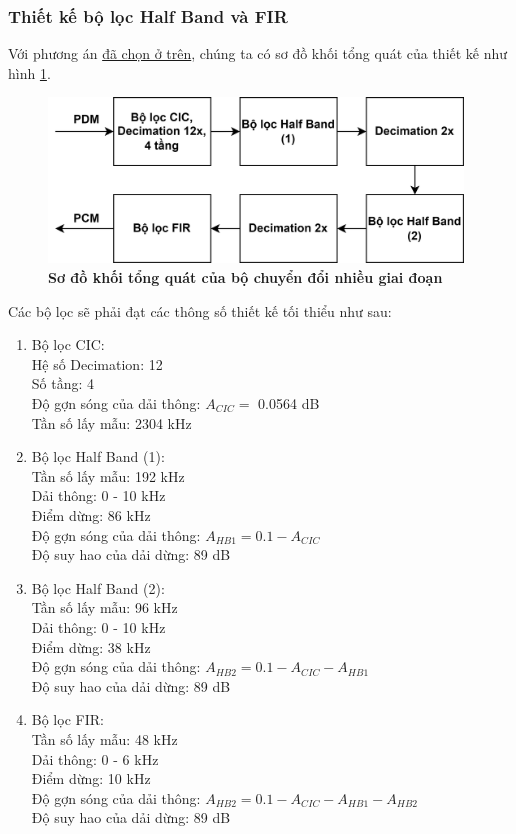 \subsubsection{Thiết kế bộ lọc Half Band và FIR}
Với phương án \hyperref[choose]{đã chọn ở trên}, chúng ta có sơ đồ khối tổng quát của thiết kế như hình \ref{pipeline_new}.
\begin{figure}[H]
    \centering
    \includegraphics[width=11cm]{Images/Chuong3/pipeline_new_top.png}
    \caption[Sơ đồ khối tổng quát của bộ chuyển đổi nhiều giai đoạn]{\bfseries \fontsize{12pt}{0pt}\selectfont Sơ đồ khối tổng quát của bộ chuyển đổi nhiều giai đoạn}
    \label{pipeline_new}
\end{figure}
 \noindent Các bộ lọc sẽ phải đạt các thông số thiết kế tối thiểu như sau:
\begin{enumerate}
    \item Bộ lọc CIC: \\
    Hệ số Decimation: 12\\
    Số tầng: 4\\
    Độ gợn sóng của dải thông: $A_{CIC} =$ 0.0564 dB\\
    Tần số lấy mẫu: 2304 kHz
    \item Bộ lọc Half Band (1):\\
    Tần số lấy mẫu: 192 kHz\\
    Dải thông: 0 - 10 kHz\\
    Điểm dừng: 86 kHz\\
    Độ gợn sóng của dải thông: $A_{HB1} = 0.1 - A_{CIC}$\\
    Độ suy hao của dải dừng: 89 dB
    \item Bộ lọc Half Band (2):\\
    Tần số lấy mẫu: 96 kHz\\
    Dải thông: 0 - 10 kHz\\
    Điểm dừng: 38 kHz\\
    Độ gợn sóng của dải thông: $A_{HB2} = 0.1 - A_{CIC} - A_{HB1}$\\
    Độ suy hao của dải dừng: 89 dB
    \item Bộ lọc FIR:\\
    Tần số lấy mẫu: 48 kHz\\
    Dải thông: 0 - 6 kHz\\
    Điểm dừng: 10 kHz\\
    Độ gợn sóng của dải thông: $A_{HB2} = 0.1 - A_{CIC} - A_{HB1} - A_{HB2}$\\
    Độ suy hao của dải dừng: 89 dB
\end{enumerate}

